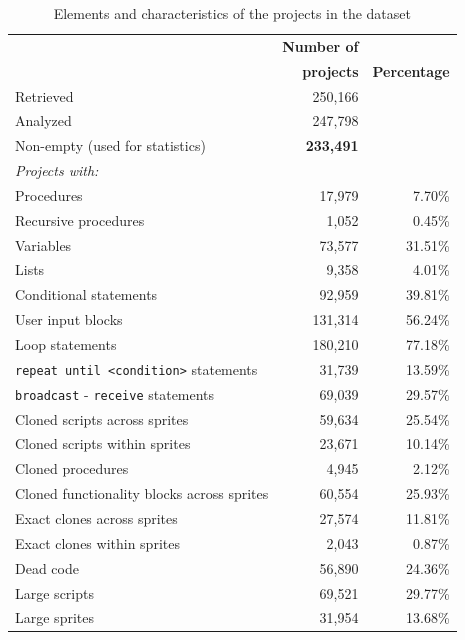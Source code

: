 \documentclass{sig-alternate}
\begin{document}
\begin{table}[ht]
	\centering
	\begin{tabular}{lrr}
		\hline
		&\textbf{Number of}&\\
		&\textbf{projects}& \textbf{Percentage}\\
		\hline
		Retrieved & 250,166 & \\
		Analyzed & 247,798 & \\
		Non-empty (used for statistics) & \textbf{233,491} & \\

		\textit{Projects with:} & & \\
		\hline
		Procedures & 17,979 & 7.70\%\\
		Recursive procedures &  1,052 & 0.45\%\\
		Variables & 73,577 & 31.51\% \\
		Lists & 9,358 & 4.01\% \\
		Conditional statements & 92,959 & 39.81\% \\
		User input blocks& 131,314 & 56.24\% \\
		Loop statements & 180,210 & 77.18\% \\
		\texttt{repeat until <condition>} statements & 31,739 & 13.59\% \\
		\texttt{broadcast} - \texttt{receive} statements & 69,039 & 29.57\%\\
		Cloned scripts across sprites & 59,634 & 25.54\% \\
		Cloned scripts within sprites & 23,671 & 10.14\%\\
		Cloned procedures & 4,945 & 2.12\%\\
		Cloned functionality blocks across sprites & 60,554 & 25.93\%\\
		Exact clones across sprites & 27,574 & 11.81\%\\
		Exact clones within sprites & 2,043 & 0.87\%\\
		Dead code & 56,890	& 24.36\%\\
		Large scripts & 69,521 & 29.77\%\\
		Large sprites & 31,954 & 13.68\%\\		
		\hline
	\end{tabular}
	\caption{Elements and characteristics of the projects in the dataset}
	\label{tbl-characteristics}
\end{table}
\end{document}
